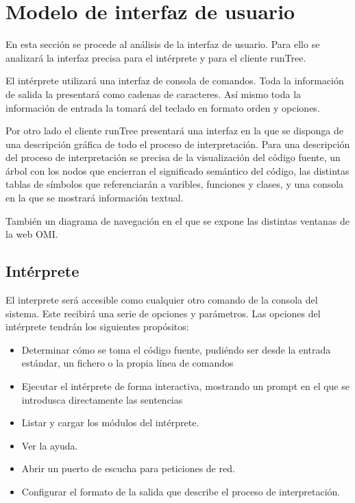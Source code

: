 \section{Modelo de interfaz de usuario}
En esta sección se procede al análisis de la interfaz de usuario. Para ello se analizará la interfaz precisa 
para el intérprete y para el cliente runTree.

El intérprete utilizará una interfaz de consola de comandos. Toda la información de salida la presentará como 
cadenas de caracteres. Así mismo toda la información de entrada la tomará del teclado en formato orden y opciones. 

Por otro lado el cliente runTree presentará una interfaz en la que se disponga de una descripción gráfica de todo el proceso 
de interpretación. Para una descripción del proceso de interpretación se precisa de la visualización del código fuente, un árbol con los nodos
que encierran el significado semántico del código, las distintas tablas de símbolos que referenciarán a varibles, funciones y clases, y una consola
en la que se mostrará información textual.

También un diagrama de navegación en el que se expone las distintas ventanas de la web OMI.
\subsection{Intérprete}
El interprete será accesible como cualquier otro comando de la consola del sistema. Este recibirá una serie de opciones y parámetros. 
Las opciones del intérprete tendrán los siguientes propósitos:
\begin{itemize}
\item Determinar cómo se toma el código fuente, pudiéndo ser desde la entrada estándar, un fichero o la propia línea de comandos
\item Ejecutar el intérprete de forma interactiva, mostrando un prompt en el que se introdusca directamente las sentencias
\item Listar y cargar los módulos del intérprete.
\item Ver la ayuda.
\item Abrir un puerto de escucha para peticiones de red.
\item Configurar el formato de la salida que describe el proceso de interpretación.
\end{itemize}

